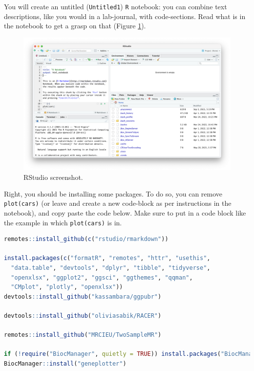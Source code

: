 \documentclass[
]{book}
\newcommand{\passthrough}[1]{#1}
\begin{document}
You will create an untitled (\passthrough{\lstinline!Untitled1!}) \passthrough{\lstinline!R!} notebook: you can combine text descriptions, like you would in a lab-journal, with code-sections. Read what is in the notebook to get a grasp on that (Figure \ref{fig:rstudio-screenshot-notebook}).

\begin{figure}[H]

{\centering \includegraphics[width=34.5in]{img/rstudio-screenshot-notebook} 

}

\caption{RStudio screenshot.}\label{fig:rstudio-screenshot-notebook}
\end{figure}

Right, you should be installing some packages. To do so, you can remove \passthrough{\lstinline!plot(cars)!} (or leave and create a new code-block as per instructions in the notebook), and copy paste the code below. Make sure to put in a code block like the example in which \passthrough{\lstinline!plot(cars)!} is in.

\begin{lstlisting}[language=R]
remotes::install_github(c("rstudio/rmarkdown"))

install.packages(c("formatR", "remotes", "httr", "usethis",
  "data.table", "devtools", "dplyr", "tibble", "tidyverse",
  "openxlsx", "ggplot2", "ggsci", "ggthemes", "qqman",
  "CMplot", "plotly", "openxlsx"))
devtools::install_github("kassambara/ggpubr")

devtools::install_github("oliviasabik/RACER")

remotes::install_github("MRCIEU/TwoSampleMR")

if (!require("BiocManager", quietly = TRUE)) install.packages("BiocManager")
BiocManager::install("geneplotter")
\end{lstlisting}
\end{document}
